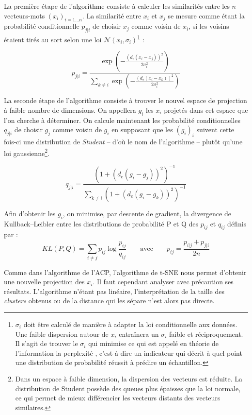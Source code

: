 \documentclass[11pt,french,french]{article}
\let\rmarkdownfootnote\footnote%
\def\footnote{\protect\rmarkdownfootnote}
\begin{document}
La première étape de l'algorithme consiste à calculer les similarités
entre les \(n\) vecteurs-mots \((x_i)_{i=1...n}\). La similarité entre
\(x_i\) et \(x_j\) se mesure comme étant la probabilité conditionnelle
\(p_{j|i}\) de choisir \(x_j\) comme voisin de \(x_i\), si les voisins
étaient tirés au sort selon une loi
\(\mathcal{N}(x_i, \sigma_i)\)\footnote{\(\sigma_i\) doit être calculé
  de manière à adapter la loi conditionnelle aux données. Une faible
  dispersion autour de \(x_i\) entraînera un \(\sigma_i\) faible et
  réciproquement. Il s'agit de trouver le \(\sigma_i\) qui minimise ce
  qui est appelé en théorie de l'information la \og perplexité \fg{},
  c'est-à-dire un indicateur qui décrit à quel point une distribution de
  probabilité réussit à prédire un échantillon.} :

\[ p_{j|i} = \frac{
\exp\left(-\frac{(d_e(x_i - x_j))^2}{2\sigma_i^2}\right)
}{
\sum_{k \neq i}
\exp\left(-\frac{(d_e(x_i - x_k))^2}{2\sigma_i^2}\right)
}\]

La seconde étape de l'algorithme consiste à trouver le nouvel espace de
projection à faible nombre de dimensions. On appellera \(g_i\) les
\(x_i\) projetés dans cet espace que l'on cherche à déterminer. On
calcule maintenant les probabilité conditionnelles \(q_{j|i}\) de
choisir \(g_j\) comme voisin de \(g_i\) en supposant que les \((g_i)_i\)
suivent cette fois-ci une distribution de \emph{Student} -- d'où le nom
de l'algorithme -- plutôt qu'une loi gaussienne\footnote{Dans un espace
  à faible dimension, la dispersion des vecteurs est réduite. La
  distribution de Student possède des queues plus épaisses que la loi
  normale, ce qui permet de mieux différencier les vecteurs distants des
  vecteurs similaires.}.

\[ q_{j|i} = \frac{(1+ (d_e(g_i - g_j))^2)^{-1}}{\sum_{k \neq i}{(1+ (d_e(g_i - g_k))^2)^{-1}}}\]

Afin d'obtenir les \(g_i\), on minimise, par descente de gradient, la
divergence de Kullback--Leibler entre les distributions de probabilité P
et Q des \(p_{ij}\) et \(q_{ij}\) définis par :
\[KL(P,Q) = \sum_{i \neq j} { p_{ij} \log{\frac{p_{ij}}{q_{ij}}}} \qquad\text{avec}\qquad p_{ij} = \frac{p_{i|j} + p_{j|i}}{2n}\]

Comme dans l'algorithme de l'ACP, l'algorithme de t-SNE nous permet
d'obtenir une nouvelle projection des \(x_i\). Il faut cependant
analyser avec précaution ses résultats. L'algorithme n'étant pas
linéaire, l'interprétation de la taille des \emph{clusters} obtenus ou
de la distance qui les sépare n'est alors pas directe.
\end{document}
